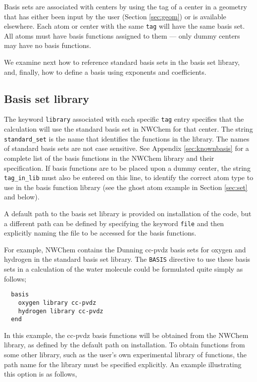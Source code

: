 Basis sets are associated with centers by using the tag of a center in
a geometry that has either been input by the user (Section
\ref{sec:geom}) or is available elsewhere.  Each atom or center with
the same \verb+tag+ will have the same basis set.  All atoms must have
basis functions assigned to them --- only dummy centers may have no
basis functions.

We examine next how to reference standard basis sets in the basis set
library, and, finally, how to define a basis using exponents and
coefficients.

\subsection{Basis set library}

The keyword \verb+library+ associated with each specific \verb+tag+
entry specifies that the calculation will use the
standard basis set in NWChem for that center.  The string \verb+standard_set+ is the
name that identifies the functions in the library.  The names of
standard basis sets are not case sensitive.  See Appendix
\ref{sec:knownbasis} for a complete list of the basis functions in the
NWChem library and their specification.  If basis functions are to be
placed upon a dummy center, the string \verb+tag_in_lib+ must also be
entered on this line, to identify the correct atom type to use in the
basis function library (see the ghost atom example in Section
\ref{sec:set} and below).

A default path to the basis set library is provided on installation of
the code, but a different path can be defined by specifying the
keyword \verb+file+ and then explicitly naming the file to be accessed
for the basis functions.

For example, NWChem contains the Dunning cc-pvdz basis sets for
oxygen and hydrogen in the standard basis set library.  The \verb+BASIS+
directive to use these basis sets in a calculation of the water molecule
could be formulated quite simply as follows;

\begin{verbatim}
  basis
    oxygen library cc-pvdz
    hydrogen library cc-pvdz
  end
\end{verbatim}

In this example, the cc-pvdz basis functions will be obtained from the
NWChem library, as defined by the default path on installation.  To obtain
functions from some other library, such as the user's own experimental
library of functions, the path name for the library must be specified
explicitly.  An example illustrating this option is as follows,

